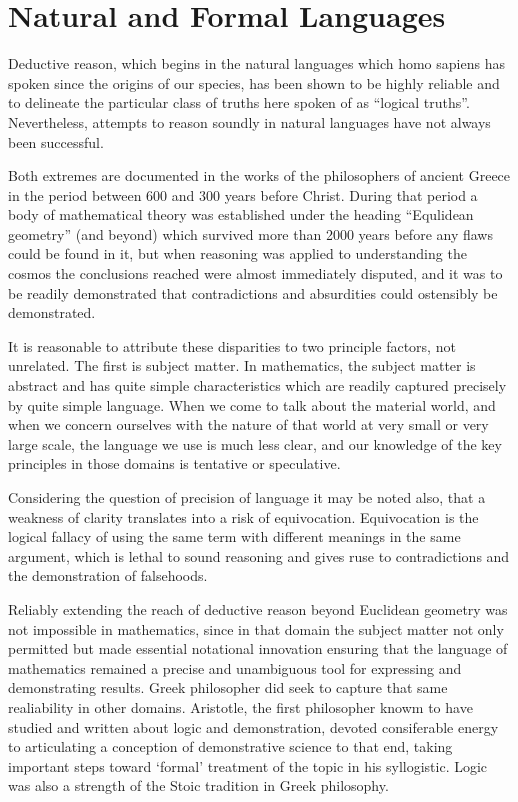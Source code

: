 \documentclass[10pt,titlepage]{book}
\begin{document}
\cite{heijenoort67,post21,godel30a,tarski31,tarski56,carnap47}

\section{Natural and Formal Languages}

Deductive reason, which begins in the natural languages which homo sapiens has spoken since the origins of our species, has been shown to be highly reliable and to delineate the particular class of truths here spoken of as ``logical truths''.
Nevertheless, attempts to reason soundly in natural languages have not always been successful.

Both extremes are documented in the works of the philosophers of ancient Greece in the period between 600 and 300 years before Christ.
During that period a body of mathematical theory was established under the heading ``Equlidean geometry'' (and beyond) which survived more than 2000 years before any flaws could be found in it, but when reasoning was applied to understanding the cosmos the conclusions reached were almost immediately disputed, and it was to be readily demonstrated that contradictions and absurdities could ostensibly be demonstrated.

It is reasonable to attribute these disparities to two principle factors, not unrelated.
The first is subject matter.
In mathematics, the subject matter is abstract and has quite simple characteristics which are readily captured precisely by quite simple language.
When we come to talk about the material world, and when we concern ourselves with the nature of that world at very small or very large scale, the language we use is much less clear, and our knowledge of the key principles in those domains is tentative or speculative.

Considering the question of precision of language it may be noted also, that a weakness of clarity translates into a risk of equivocation.
Equivocation is the logical fallacy of using the same term with different meanings in the same argument, which is lethal to sound reasoning and gives ruse to contradictions and the demonstration of falsehoods.

Reliably extending the reach of deductive reason beyond Euclidean geometry was not impossible in mathematics, since in that domain the subject matter not only permitted but made essential notational innovation ensuring that the language of mathematics remained a precise and unambiguous tool for expressing and demonstrating results.
Greek philosopher did seek to capture that same realiability in other domains.
Aristotle, the first philosopher knowm to have studied and written about logic and demonstration, devoted consiferable energy to articulating a conception of demonstrative science to that end, taking important steps toward `formal' treatment of the topic in his syllogistic.
Logic was also a strength of the Stoic tradition in Greek philosophy.
\end{document}
